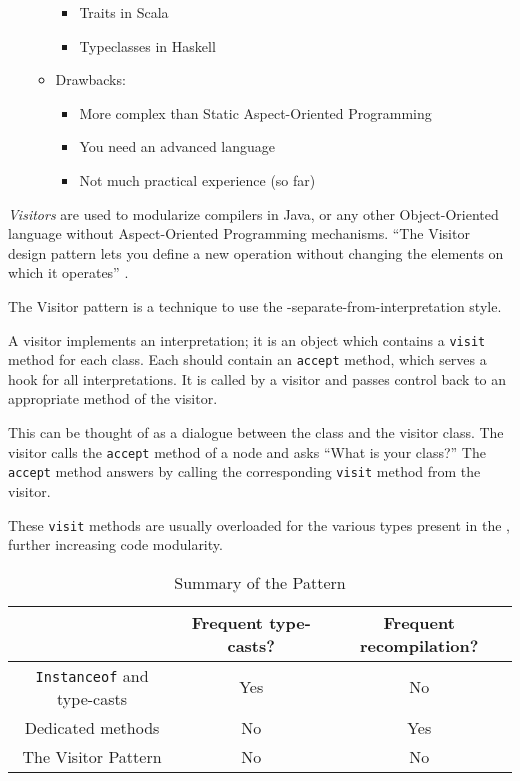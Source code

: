 \begin{enumerate}[noitemsep]
\begin{itemize}[noitemsep]
\begin{itemize}[noitemsep]
    \item Traits in Scala
    \item Typeclasses in Haskell
    \end{itemize}
  \item Drawbacks:
    \begin{itemize}[noitemsep]
    \item More complex than Static Aspect-Oriented Programming
    \item You need an advanced language
    \item Not much practical experience (so far)
    \end{itemize}
  \end{itemize}
\end{enumerate}

\begin{definition}[Visitors]\label{def:Visitors}
  \emph{Visitors} are used to modularize compilers in Java, or any other Object-Oriented language without Aspect-Oriented Programming mechanisms.
  ``The Visitor design pattern lets you define a new operation without changing the elements on which it operates'' \parencite{ElementsReusableObjectOrientedSoftware1994}.

  The Visitor pattern is a technique to use the -separate-from-interpretation style.

  A visitor implements an interpretation; it is an object which contains a \texttt{visit} method for each  class.
  Each  should contain an \texttt{accept} method, which serves a hook for all interpretations.
  It is called by a visitor and passes control back to an appropriate method of the visitor.

  This can be thought of as a dialogue between the  class and the visitor class.
  The visitor calls the \texttt{accept} method of a node and asks ``What is your class?''
  The \texttt{accept} method answers by calling the corresponding \texttt{visit} method from the visitor.

  These \texttt{visit} methods are usually overloaded for the various types present in the , further increasing code modularity.
\end{definition}

\begin{table}[h!]
  \centering
  \begin{tabular}{ccc}
    \toprule
    & Frequent type-casts? & Frequent recompilation? \\
    \midrule
    \texttt{Instanceof} and type-casts & Yes & No \\
    Dedicated methods & No & Yes \\
    The Visitor Pattern & No & No \\
    \bottomrule
  \end{tabular}
  \caption{Summary of the  Pattern}
  \label{tab:Visitor_Pattern_Summary}
\end{table}
